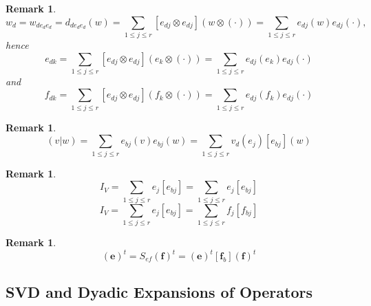 \documentclass[aps,preprint]{revtex4}
\newtheorem{remark}[theorem]{Remark}
\begin{document}
\begin{remark}
\begin{equation}
w_{d}=w_{de_{d}e_{d}}=d_{de_{d}e_{d}}\left( w\right) =\sum_{1\leq j\leq r} 
\left[ e_{dj}\otimes e_{dj}\right] \left( w\otimes \left( \cdot \right)
\right) =\sum_{1\leq j\leq r}e_{dj}\left( w\right) e_{dj}\left( \cdot
\right) ,
\end{equation}%
hence 
\begin{equation}
e_{dk}=\sum_{1\leq j\leq r}\left[ e_{dj}\otimes e_{dj}\right] \left(
e_{k}\otimes \left( \cdot \right) \right) =\sum_{1\leq j\leq r}e_{dj}\left(
e_{k}\right) e_{dj}\left( \cdot \right)
\end{equation}%
and 
\begin{equation}
f_{dk}=\sum_{1\leq j\leq r}\left[ e_{dj}\otimes e_{dj}\right] \left(
f_{k}\otimes \left( \cdot \right) \right) =\sum_{1\leq j\leq r}e_{dj}\left(
f_{k}\right) e_{dj}\left( \cdot \right)
\end{equation}
\end{remark}

\begin{remark}
\begin{equation}
\left( \left. v\right\vert w\right) =\sum_{1\leq j\leq r}e_{bj}\left(
v\right) e_{bj}\left( w\right) =\sum_{1\leq j\leq r}v_{d}\left( e_{j}\right) 
\left[ e_{bj}\right] \left( w\right)
\end{equation}
\end{remark}

\begin{remark}
\begin{equation}
I_{V}=\sum_{1\leq j\leq r}e_{j}\left[ e_{bj}\right] =\sum_{1\leq j\leq
r}e_{j}\left[ e_{bj}\right]
\end{equation}%
\begin{equation}
I_{V}=\sum_{1\leq j\leq r}e_{j}\left[ e_{bj}\right] =\sum_{1\leq j\leq
r}f_{j}\left[ f_{bj}\right]
\end{equation}
\end{remark}

\begin{remark}
\begin{equation}
\left( \boldsymbol{e}\right) ^{t}=S_{ef}\left( \boldsymbol{f}\right)
^{t}=\left( \boldsymbol{e}\right) ^{t}\left[ \boldsymbol{f}_{b}\right]
\left( \boldsymbol{f}\right) ^{t}
\end{equation}
\end{remark}

\subsection{SVD and Dyadic Expansions of Operators}
\end{document}
